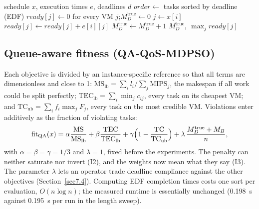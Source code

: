 \documentclass[pdflatex,sn-basic]{sn-jnl}
\theoremstyle{thmstyleone}%
\theoremstyle{thmstyletwo}%
\theoremstyle{thmstylethree}%
\newcommand{\fitQA}{\mathrm{fit}_{\mathrm{QA}}}
\begin{document}
\begin{algorithm}[!t]
\caption{Queue-aware deadline evaluation}\label{alg:qa}
\begin{algorithmic}[1]
\Require schedule $x$, execution times $e$, deadlines $d$
\State $\mathit{order}\leftarrow$ tasks sorted by deadline (EDF)
\State $\mathit{ready}[j]\leftarrow 0$ for every VM $j$;\quad $M_D^{\mathrm{true}}\leftarrow 0$
  \State $j\leftarrow x[i]$
  \State $\mathit{ready}[j]\leftarrow \mathit{ready}[j]+e[i][j]$ 
   \State $M_D^{\mathrm{true}}\leftarrow M_D^{\mathrm{true}}+1$ \EndIf
\EndFor
\State \Return $M_D^{\mathrm{true}},\ \max_j \mathit{ready}[j]$ 
\end{algorithmic}
\end{algorithm}

\subsection{Queue-aware fitness (QA-QoS-MDPSO)}\label{sec5.2}
Each objective is divided by an instance-specific reference so that all terms are dimensionless and close to 1: $\mathrm{MS}_{\mathrm{lb}}=\sum_i l_i/\sum_j \mathrm{MIPS}_j$, the makespan if all work could be split perfectly; $\mathrm{TEC}_{\mathrm{lb}}=\sum_i\min_j c_{ij}$, every task on its cheapest VM; and $\mathrm{TC}_{\mathrm{ub}}=\sum_i f_i\max_jF_j$, every task on the most credible VM. Violations enter additively as the fraction of violating tasks:
\begin{equation}
\fitQA(x)=\alpha\frac{\mathrm{MS}}{\mathrm{MS}_{\mathrm{lb}}}+\beta\frac{\mathrm{TEC}}{\mathrm{TEC}_{\mathrm{lb}}}+\gamma\Bigl(1-\frac{\mathrm{TC}}{\mathrm{TC}_{\mathrm{ub}}}\Bigr)+\lambda\,\frac{M_D^{\mathrm{true}}+M_B}{n},
\label{eq:fitqa}
\end{equation}
with $\alpha=\beta=\gamma=1/3$ and $\lambda=1$, fixed before the experiments. The penalty can neither saturate nor invert (I2), and the weights now mean what they say (I3). The parameter $\lambda$ lets an operator trade deadline compliance against the other objectives (Section~\ref{sec7.4}). Computing EDF completion times costs one sort per evaluation, $O(n\log n)$; the measured runtime is essentially unchanged (0.198~s against 0.195~s per run in the length sweep).
\end{document}
